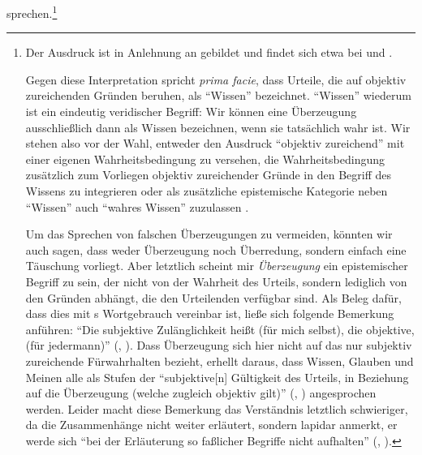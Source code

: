 sprechen.\footnote{Der Ausdruck ist in Anlehnung an
\textcite[vgl.][]{Williams:MoralLuck1981} gebildet und findet sich etwa bei
\textcite[vgl.][]{Engel:IsEpistemicLuckCompatiblewithKnowledge1992} und
\textcite[vgl.][\pno~104\,f.]{Hills:MoralTestimonyandMoralEpistemology2009}.

Gegen diese Interpretation spricht \emph{prima facie}, dass
 Urteile, die auf objektiv zureichenden Gründen beruhen, als \enquote{Wissen} bezeichnet.
\enquote{Wissen} wiederum ist ein eindeutig veridischer Begriff: Wir können eine
Überzeugung ausschließlich dann als Wissen bezeichnen, wenn sie tatsächlich wahr
ist. Wir stehen also vor der Wahl, entweder den Ausdruck \enquote{objektiv
zureichend} mit einer eigenen Wahrheitsbedingung zu versehen, die
Wahrheitsbedingung zusätzlich zum Vorliegen objektiv zureichender Gründe in den
Begriff des Wissens zu integrieren oder als zusätzliche epistemische Kategorie
neben \enquote{Wissen} auch \enquote{wahres Wissen}
zuzulassen \parencite[vgl.][330]{Chignell:BeliefinKant2007}.

Um das Sprechen von falschen Überzeugungen zu vermeiden, könnten wir auch sagen,
dass weder Überzeugung noch Überredung, sondern einfach eine Täuschung vorliegt.
Aber letztlich scheint mir \emph{Überzeugung} ein epistemischer Begriff zu sein,
der nicht von der Wahrheit des Urteils, sondern lediglich von den Gründen
abhängt, die den Urteilenden verfügbar sind. Als Beleg dafür, dass dies mit
s Wortgebrauch vereinbar ist, ließe sich folgende Bemerkung
anführen: \enquote{Die subjektive Zulänglichkeit heißt  (für
mich selbst), die objektive,  (für
jedermann)} \mkbibparens{\cite[][B 850]{Kant:KritikderreinenVernunft2003},
\cite[][III: 533.5--7]{Kant:GesammelteWerke1900ff.}}. Dass Überzeugung sich hier
nicht auf das nur subjektiv zureichende Fürwahrhalten bezieht, erhellt daraus,
dass Wissen, Glauben und Meinen alle als Stufen der \enquote{subjektive[n]
Gültigkeit des Urteils, in Beziehung auf die Überzeugung (welche zugleich
objektiv gilt)} \mkbibparens{\cite[][B 850]{Kant:KritikderreinenVernunft2003},
\cite[][III: 532.36--37]{Kant:GesammelteWerke1900ff.}} angesprochen
werden. Leider macht diese Bemerkung das Verständnis letztlich
schwieriger, da  die Zusammenhänge nicht weiter
erläutert, sondern lapidar anmerkt, er werde sich \enquote{bei der Erläuterung
so faßlicher Begriffe nicht aufhalten} \mkbibparens{\cite[][B
850]{Kant:KritikderreinenVernunft2003}, \cite[][III:
533.7--8]{Kant:GesammelteWerke1900ff.}}.}

